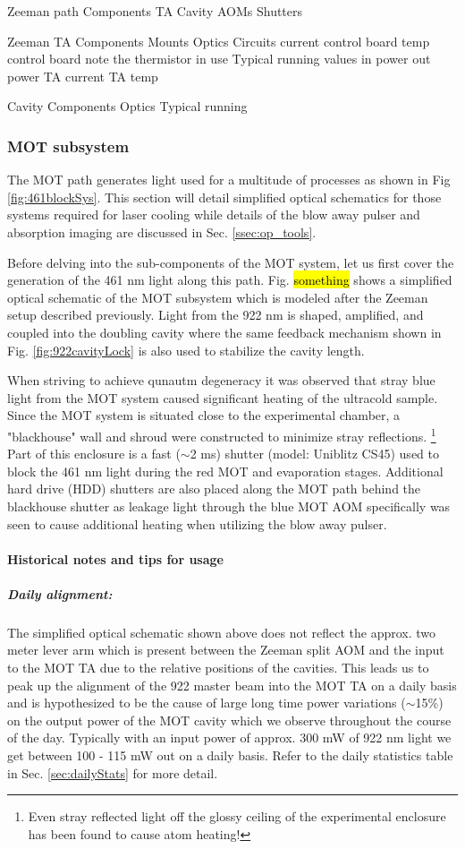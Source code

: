 Zeeman path
	Components
		TA
		Cavity
		AOMs
		Shutters
	
	Zeeman TA
		Components
			Mounts
			Optics
			Circuits
				current control board
				temp control board
					note the thermistor in use
		Typical running values
			in power
			out power
			TA current
			TA temp
		
	Cavity
		Components
			Optics
		Typical running
		
\subsubsection{MOT subsystem}

The MOT path generates light used for a multitude of processes as shown in Fig \ref{fig:461blockSys}.
This section will detail simplified optical schematics for those systems required for laser cooling while details of the blow away pulser and absorption imaging are discussed in Sec. \ref{ssec:op_tools}.

Before delving into the sub-components of the MOT system, let us first cover the generation of the 461 nm light along this path.
Fig. \hl{something} shows a simplified optical schematic of the MOT subsystem which is modeled after the Zeeman setup described previously.
Light from the 922 nm is shaped, amplified, and coupled into the doubling cavity where the same feedback mechanism shown in Fig. \ref{fig:922cavityLock} is also used to stabilize the cavity length.

When striving to achieve qunautm degeneracy it was observed that stray blue light from the MOT system caused significant heating of the ultracold sample. 
Since the MOT system is situated close to the experimental chamber, a "blackhouse" wall and shroud were constructed to minimize stray reflections.
\footnote{Even stray reflected light off the glossy ceiling of the experimental enclosure has been found to cause atom heating!}
Part of this enclosure is a fast ($\sim$2 ms) shutter (model: Uniblitz CS45) used to block the 461 nm light during the red MOT and evaporation stages.
Additional hard drive (HDD) shutters are also placed along the MOT path behind the blackhouse shutter as leakage light through the blue MOT AOM specifically was seen to cause additional heating when utilizing the blow away pulser.

\paragraph{Historical notes and tips for usage}
\subparagraph{Daily alignment:}
The simplified optical schematic shown above does not reflect the approx. two meter lever arm which is present between the Zeeman split AOM and the input to the MOT TA due to the relative positions of the cavities.
This leads us to peak up the alignment of the 922 master beam into the MOT TA on a daily basis and is hypothesized to be the cause of large long time power variations ($\sim$15\%) on the output power of the MOT cavity which we observe throughout the course of the day.
Typically with an input power of approx. 300 mW of 922 nm light we get between 100 - 115 mW out on a daily basis.
Refer to the daily statistics table in Sec. \ref{sec:dailyStats} for more detail.

